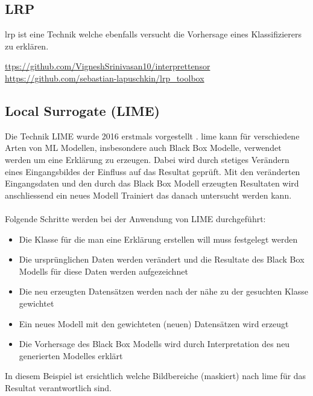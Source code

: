 \documentclass[
  12pt, %
  a4paper, %
  oneside, %
  openany, 
  numbers=noenddot, %
  BCOR=5mm, %
  parskip=half*, %
  thesis, %
]{bfhbook}
\begin{document}
\subsection{LRP}
\acrfull{lrp} ist eine Technik welche ebenfalls versucht die Vorhersage eines Klassifizierers zu erklären. 

\url{ttps://github.com/VigneshSrinivasan10/interprettensor}
\url{https://github.com/sebastian-lapuschkin/lrp_toolbox}

\subsection{Local Surrogate (LIME)}
\label{lime}
Die Technik LIME wurde 2016 erstmals vorgestellt \parencite{Ribeiro2016}. 
\Gls{lime} kann für verschiedene Arten von  \Gls{ML} Modellen, insbesondere auch Black Box Modelle, verwendet werden um eine Erklärung zu erzeugen. Dabei wird durch stetiges Verändern eines Eingangsbildes der Einfluss auf das Resultat geprüft. Mit den veränderten Eingangsdaten und den durch das Black Box Modell erzeugten Resultaten wird anschliessend ein neues Modell Trainiert das danach untersucht werden kann.

\paragraph*{}
Folgende Schritte werden bei der Anwendung von LIME durchgeführt:
\begin{itemize}
	\item Die Klasse für die man eine Erklärung erstellen will muss festgelegt werden
	\item Die ursprünglichen Daten werden verändert und die Resultate des Black Box Modells für diese Daten werden aufgezeichnet
	\item Die neu erzeugten Datensätzen werden nach der nähe zu der gesuchten Klasse gewichtet
	\item Ein neues Modell mit den gewichteten (neuen) Datensätzen wird erzeugt
	\item Die Vorhersage des Black Box Modells wird durch Interpretation des neu generierten Modelles erklärt
\end{itemize}
\break
In diesem Beispiel ist ersichtlich welche Bildbereiche (maskiert) nach \gls{lime} für das Resultat verantwortlich sind.
\end{document}
